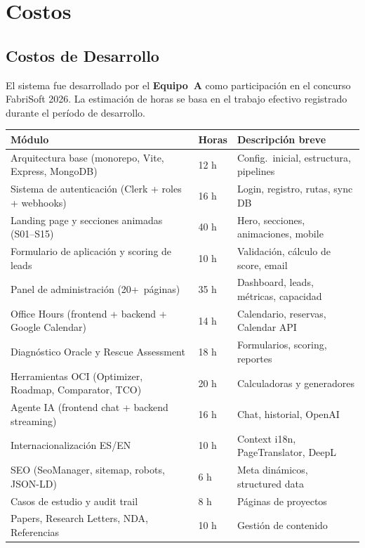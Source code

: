 \documentclass[12pt, a4paper, twoside]{report}
\begin{document}
\chapter{Costos}

\section{Costos de Desarrollo}

El sistema fue desarrollado por el \textbf{Equipo~A} como participación en el concurso
FabriSoft 2026. La estimación de horas se basa en el trabajo efectivo registrado durante
el período de desarrollo.

\begin{center}
\begin{longtable}{L{7.5cm} C{2cm} L{4cm}}
  \toprule
  \textbf{Módulo} & \textbf{Horas} & \textbf{Descripción breve} \\
  \midrule
  \endhead
  Arquitectura base (monorepo, Vite, Express, MongoDB) & 12 h & Config.\ inicial, estructura, pipelines \\[3pt]
  Sistema de autenticación (Clerk + roles + webhooks) & 16 h & Login, registro, rutas, sync DB \\[3pt]
  Landing page y secciones animadas (S01--S15) & 40 h & Hero, secciones, animaciones, mobile \\[3pt]
  Formulario de aplicación y scoring de leads & 10 h & Validación, cálculo de score, email \\[3pt]
  Panel de administración (20+~páginas) & 35 h & Dashboard, leads, métricas, capacidad \\[3pt]
  Office Hours (frontend + backend + Google Calendar) & 14 h & Calendario, reservas, Calendar API \\[3pt]
  Diagnóstico Oracle y Rescue Assessment & 18 h & Formularios, scoring, reportes \\[3pt]
  Herramientas OCI (Optimizer, Roadmap, Comparator, TCO) & 20 h & Calculadoras y generadores \\[3pt]
  Agente IA (frontend chat + backend streaming) & 16 h & Chat, historial, OpenAI \\[3pt]
  Internacionalización ES/EN & 10 h & Context i18n, PageTranslator, DeepL \\[3pt]
  SEO (SeoManager, sitemap, robots, JSON-LD) & 6 h & Meta dinámicos, structured data \\[3pt]
  Casos de estudio y audit trail & 8 h & Páginas de proyectos \\[3pt]
  Papers, Research Letters, NDA, Referencias & 10 h & Gestión de contenido \\[3pt]

\end{longtable}
\end{center}
\end{document}
